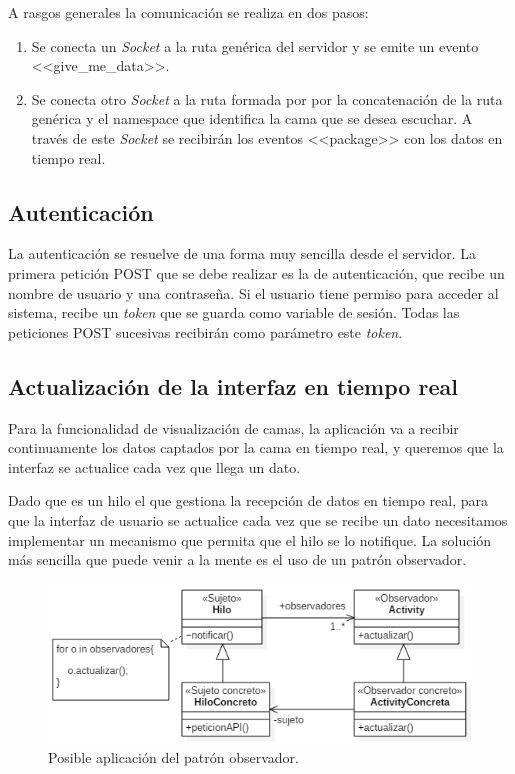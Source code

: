 A rasgos generales la comunicación se realiza en dos pasos: 

\begin{enumerate}
	\item Se conecta un \textit{Socket} a la ruta genérica del servidor y se emite un evento <<give\_me\_data>>. 
	\item Se conecta otro \textit{Socket} a la ruta formada por por la concatenación de la ruta genérica y el namespace que identifica la cama que se desea escuchar. A través de este \textit{Socket} se recibirán los eventos <<package>> con los datos en tiempo real. 
\end{enumerate}

\subsection{Autenticación}

La autenticación se resuelve de una forma muy sencilla desde el servidor. La primera petición POST que se debe realizar es la de autenticación, que recibe un nombre de usuario y una contraseña. Si el usuario tiene permiso para acceder al sistema, recibe un \textit{token} que se guarda como variable de sesión. Todas las peticiones POST sucesivas recibirán como parámetro este \textit{token}. 

\subsection{Actualización de la interfaz en tiempo real}

Para la funcionalidad de visualización de camas, la aplicación va a recibir continuamente los datos captados por la cama en tiempo real, y queremos que la interfaz se actualice cada vez que llega un dato. 

Dado que es un hilo el que gestiona la recepción de datos en tiempo real, para que la interfaz de usuario se actualice cada vez que se recibe un dato necesitamos implementar un mecanismo que permita que el hilo se lo notifique. La solución más sencilla que puede venir a la mente es el uso de un patrón observador. 

\begin{figure}[H]
	\centering
	\includegraphics[width=1\textwidth]{../img/observador.png}
	\caption{Posible aplicación del patrón observador.}
	\label{fig:observador}
\end{figure}

